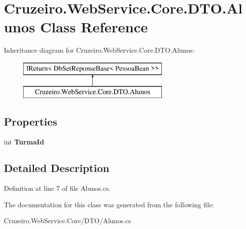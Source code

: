 \hypertarget{class_cruzeiro_1_1_web_service_1_1_core_1_1_d_t_o_1_1_alunos}{}\section{Cruzeiro.\+Web\+Service.\+Core.\+D\+T\+O.\+Alunos Class Reference}
\label{class_cruzeiro_1_1_web_service_1_1_core_1_1_d_t_o_1_1_alunos}
Inheritance diagram for Cruzeiro.\+Web\+Service.\+Core.\+D\+T\+O.\+Alunos\+:\begin{figure}[H]
\begin{center}
\leavevmode
\includegraphics[height=2.000000cm]{class_cruzeiro_1_1_web_service_1_1_core_1_1_d_t_o_1_1_alunos}
\end{center}
\end{figure}
\subsection*{Properties}
\begin{DoxyCompactItemize}
\item 
int {\bfseries Turma\+Id}\hypertarget{class_cruzeiro_1_1_web_service_1_1_core_1_1_d_t_o_1_1_alunos_a11c3f63c416e6b95b4fc6aacb111f637}{}\label{class_cruzeiro_1_1_web_service_1_1_core_1_1_d_t_o_1_1_alunos_a11c3f63c416e6b95b4fc6aacb111f637}

\end{DoxyCompactItemize}


\subsection{Detailed Description}


Definition at line 7 of file Alunos.\+cs.



The documentation for this class was generated from the following file\+:\begin{DoxyCompactItemize}
\item 
Cruzeiro.\+Web\+Service.\+Core/\+D\+T\+O/Alunos.\+cs\end{DoxyCompactItemize}
